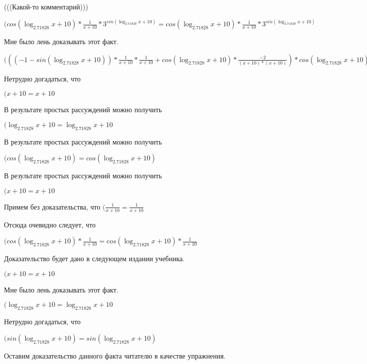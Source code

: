 \documentclass[12pt,a4paper,fleqn]{article}
\theoremstyle{definition}
\begin{document}
(((Какой-то комментарий)))

$(cos(\log_{ 2.71828 }{ x  +  10 }) * \frac{ 1 }{ x  +  10 }
 * { 3 }^{sin(\log_{ 2.71828 }{ x  +  10 })} = cos(\log_{ 2.71828 }{ x  +  10 }) * \frac{ 1 }{ x  +  10 }
 * { 3 }^{sin(\log_{ 2.71828 }{ x  +  10 })}$

Мне было лень доказывать этот факт.

$((( -1  - sin(\log_{ 2.71828 }{ x  +  10 })) * \frac{ 1 }{ x  +  10 }
 * \frac{ 1 }{ x  +  10 }
 + cos(\log_{ 2.71828 }{ x  +  10 }) * \frac{ -2 }{( x  +  10 ) * ( x  +  10 )}
) * cos(\log_{ 2.71828 }{ x  +  10 }) * \frac{ 1 }{ x  +  10 }
 * { 3 }^{sin(\log_{ 2.71828 }{ x  +  10 })} = (( -1  - sin(\log_{ 2.71828 }{ x  +  10 })) * \frac{ 1 }{ x  +  10 }
 * \frac{ 1 }{ x  +  10 }
 + cos(\log_{ 2.71828 }{ x  +  10 }) * \frac{ -2 }{( x  +  10 ) * ( x  +  10 )}
) * cos(\log_{ 2.71828 }{ x  +  10 }) * \frac{ 1 }{ x  +  10 }
 * { 3 }^{sin(\log_{ 2.71828 }{ x  +  10 })}$

Нетрудно догадаться, что

$( x  +  10  =  x  +  10 $

В результате простых рассуждений можно получить

$(\log_{ 2.71828 }{ x  +  10 } = \log_{ 2.71828 }{ x  +  10 }$

В результате простых рассуждений можно получить

$(cos(\log_{ 2.71828 }{ x  +  10 }) = cos(\log_{ 2.71828 }{ x  +  10 })$

В результате простых рассуждений можно получить

$( x  +  10  =  x  +  10 $

Примем без доказательства, что
$(\frac{ 1 }{ x  +  10 }
 = \frac{ 1 }{ x  +  10 }
$

Отсюда очевидно следует, что

$(cos(\log_{ 2.71828 }{ x  +  10 }) * \frac{ 1 }{ x  +  10 }
 = cos(\log_{ 2.71828 }{ x  +  10 }) * \frac{ 1 }{ x  +  10 }
$

Доказательство будет дано в следующем издании учебника.

$( x  +  10  =  x  +  10 $

Мне было лень доказывать этот факт.

$(\log_{ 2.71828 }{ x  +  10 } = \log_{ 2.71828 }{ x  +  10 }$

Нетрудно догадаться, что

$(sin(\log_{ 2.71828 }{ x  +  10 }) = sin(\log_{ 2.71828 }{ x  +  10 })$

Оставим доказательство данного факта читателю в качестве упражнения.
\end{document}
